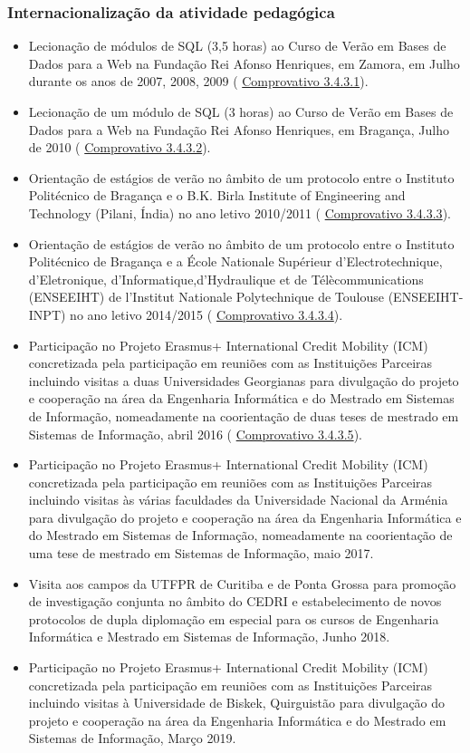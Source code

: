 \documentclass[11pt]{article}
\begin{document}
\subsubsection{Internacionalização da atividade pedagógica}
\begin{itemize}
\item{Lecionação de módulos de SQL (3,5 horas) ao Curso de Verão em Bases de Dados para a Web na Fundação Rei Afonso Henriques, em Zamora, em Julho durante os anos de 2007, 2008, 2009 (
\href{run:MissaoIPBoutros/AfonsoHenriques.pdf}{Comprovativo 3.4.3.1}).}
\item{Lecionação de um módulo de SQL (3 horas) ao Curso de Verão em Bases de Dados para a Web na Fundação Rei Afonso Henriques, em Bragança, Julho de 2010 (
\href{run:MissaoIPBoutros/AfonsoHenriques2.pdf}{Comprovativo 3.4.3.2}).}
\item{Orientação de estágios de verão no âmbito de um protocolo entre o Instituto Politécnico de Bragança e o B.K. Birla Institute of Engineering and Technology (Pilani, Índia) no ano letivo 2010/2011 (
\href{run:CoOrientTrabalhos/AlunoIndiano.pdf}{Comprovativo 3.4.3.3}).}
\item{Orientação de estágios de verão no âmbito de um protocolo entre o Instituto Politécnico de Bragança e a École Nationale Supérieur d'Electrotechnique, d'Eletronique, d'Informatique,d'Hydraulique et de Télècommunications (ENSEEIHT) de l'Institut Nationale Polytechnique de Toulouse (ENSEEIHT-INPT) no ano letivo 2014/2015 (
\href{run:CoOrientTrabalhos/AlunosFrancesesBalsa.pdf}{Comprovativo 3.4.3.4}).}
\item{Participação no Projeto Erasmus+ International Credit Mobility (ICM) concretizada pela participação em reuniões com as Instituições Parceiras incluindo visitas a duas Universidades Georgianas para divulgação do projeto e cooperação na área da Engenharia Informática e do Mestrado em Sistemas de Informação, nomeadamente na coorientação de duas teses de mestrado em Sistemas de Informação, abril 2016 (
\href{run:MissaoIPBoutros/ICM.pdf}{Comprovativo 3.4.3.5}).}
\item{Participação no Projeto Erasmus+ International Credit Mobility (ICM) concretizada pela participação em reuniões com as Instituições Parceiras incluindo visitas às várias faculdades da Universidade Nacional da Arménia para divulgação do projeto e cooperação na área da Engenharia Informática e do Mestrado em Sistemas de Informação, nomeadamente na coorientação de uma tese de mestrado em Sistemas de Informação, maio 2017.}
\item{Visita aos campos da UTFPR de Curitiba e de Ponta Grossa para promoção de investigação conjunta no âmbito do CEDRI e estabelecimento de novos protocolos de dupla diplomação em especial para os cursos de Engenharia Informática e Mestrado em Sistemas de Informação, Junho 2018.}
\item{Participação no Projeto Erasmus+ International Credit Mobility (ICM) concretizada pela participação em reuniões com as Instituições Parceiras incluindo visitas à Universidade de Biskek, Quirguistão para divulgação do projeto e cooperação na área da Engenharia Informática e do Mestrado em Sistemas de Informação, Março 2019.}
\end{itemize}
\end{document}
